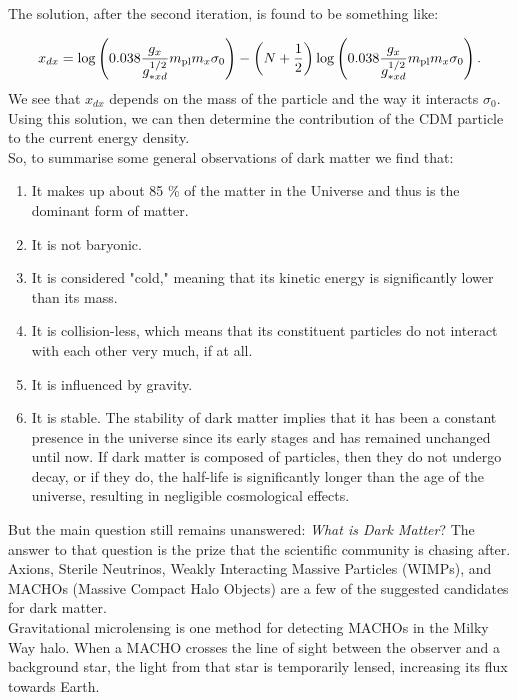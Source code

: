 The solution, after the second iteration, is found to be something like: 

\begin{align}
    x_{dx} = \log \qty(\num{.038} \frac{g_{x}}{g_{*xd}^{1/2}} m _{\text{pl}}  m_x \sigma_0 ) - \qty(N + \frac{1}{2}) \log\qty(\num{.038} \frac{g_{x}}{g_{*xd}^{1/2}} m _{\text{pl}}  m_x \sigma_0 )\,. 
\end{align}
We see that \(x_{dx}\) depends on the mass of the particle and the way it interacts \(\sigma_0 \). Using this solution, we can then determine the contribution of the CDM particle to the current energy density.\\
\hspace{0.5cm}So, to summarise some general observations of dark matter we find that:
 \begin{enumerate}
     \item  It makes up about 85 \% of the matter in the Universe and thus is the dominant form of matter.
     \item It is not baryonic.
     \item  It is considered "cold," meaning that its kinetic energy is significantly lower than its mass.
     \item It is collision-less, which means that its constituent particles do not interact with each other very much, if at all.
     \item It is influenced by gravity.
     \item It is stable. The stability of dark matter implies that it has been a constant presence in the universe since its early stages and has remained unchanged until now. If dark matter is composed of particles, then they do not undergo decay, or if they do, the half-life is significantly longer than the age of the universe, resulting in negligible cosmological effects.
 \end{enumerate}
\hspace{0.5cm}But the main question still remains unanswered: \emph{What is Dark Matter}? The answer to that question is the prize that the scientific community is chasing after.\\
Axions, Sterile Neutrinos, Weakly Interacting Massive Particles (WIMPs), and MACHOs (Massive Compact Halo Objects) are a few of the suggested candidates for dark matter.\\
Gravitational microlensing is one method for detecting MACHOs in the Milky Way halo. When a MACHO crosses the line of sight between the observer and a background star, the light from that star is temporarily lensed, increasing its flux towards Earth.\\
